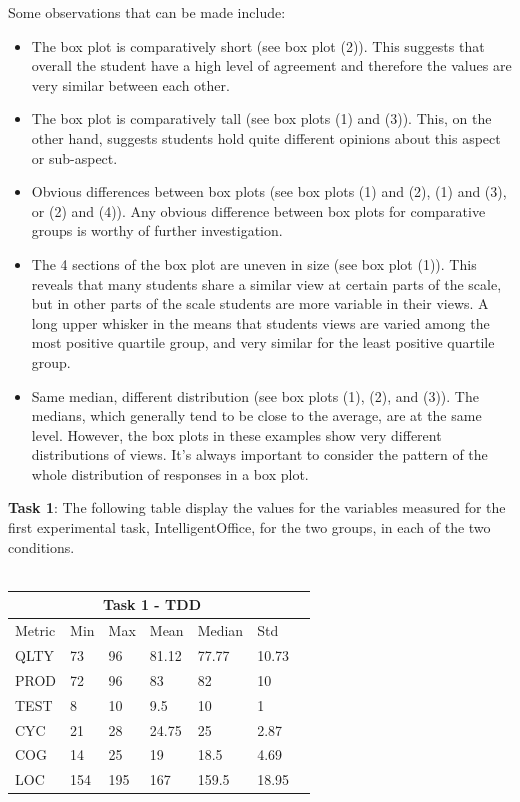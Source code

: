 Some observations that can be made include:
\begin{itemize}
    \item The box plot is comparatively short (see box plot  (2)). This suggests that overall the student have a high level of agreement and therefore the values are very similar between each other.
    \item The box plot is comparatively tall (see box plots (1) and (3)). This, on the other hand, suggests students hold quite different opinions about this aspect or sub-aspect.
    \item Obvious differences between box plots (see box plots (1) and (2), (1) and (3), or (2) and (4)). Any obvious difference between box plots for comparative groups is worthy of further investigation.
    \item The 4 sections of the box plot are uneven in size (see box plot (1)). This reveals that many students share a similar view at certain parts of the scale, but in other parts of the scale students are more variable in their views. A long upper whisker in the means that students views are varied among the most positive quartile group, and very similar for the least positive quartile group. 
    \item Same median, different distribution (see box plots (1), (2), and (3)). The medians, which generally tend to be close to the average, are at the same level. However, the box plots in these examples show very different distributions of views. It's always important to consider the pattern of the whole distribution of responses in a box plot.
\end{itemize}

\noindent\textbf{Task 1}: The following table display the values for the variables measured for the first experimental task, IntelligentOffice, for the two groups, in each of the two conditions.
\\ \  \\
\noindent
\begin{tabular}{ |p{2cm}||p{1.6cm}|p{1.6cm}|p{1.6cm}|p{1.6cm}|p{1.6cm}|p{1.6cm}| }
    \hline
        \multicolumn{6}{|c|}{Task 1 - TDD} \\
    \hline
        Metric & Min & Max & Mean & Median & Std \\
    \hline
        QLTY & 73 & 96 & 81.12 & 77.77 & 10.73 \\
        PROD & 72 & 96 & 83 & 82 & 10 \\
        TEST & 8 & 10 & 9.5 & 10 & 1 \\
        CYC & 21 & 28 & 24.75 & 25 & 2.87 \\
        COG & 14 & 25 & 19 & 18.5 & 4.69 \\
        LOC & 154 & 195 & 167 & 159.5 & 18.95 \\
    \hline
\end{tabular}
\\ \  \\

